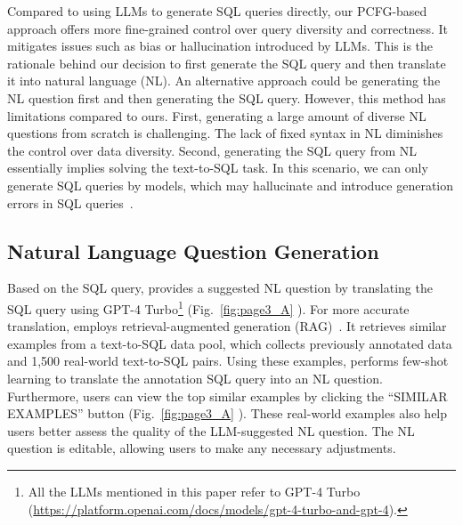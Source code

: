 Compared to using LLMs to generate SQL queries directly, our PCFG-based approach offers more fine-grained control over query diversity and correctness. It mitigates issues such as bias or hallucination introduced by LLMs. This is the rationale behind our decision to first generate the SQL query and then translate it into natural language (NL).
An alternative approach could be generating the NL question first and then generating the SQL query. However, this method has limitations compared to ours. 
First, generating a large amount of diverse NL questions from scratch is challenging. The lack of fixed syntax in NL diminishes the control over data diversity. 
Second, generating the SQL query from NL essentially implies solving the text-to-SQL task. In this scenario, we can only generate SQL queries by models, which may hallucinate and introduce generation errors in SQL queries~\cite{ning_empirical_2023, tiis_sql}.

\subsection{\textbf{Natural Language Question Generation}}
Based on the SQL query, {\tool} provides a suggested NL question by translating the SQL query using GPT-4 Turbo\footnote{All the LLMs mentioned in this paper refer to GPT-4 Turbo (\url{https://platform.openai.com/docs/models/gpt-4-turbo-and-gpt-4}).} (Fig.~\ref{fig:page3_A} ).
For more accurate translation, {\tool} employs retrieval-augmented generation  (RAG)~\cite{rag1, rag2}. 
It retrieves similar examples from a text-to-SQL data pool, which collects previously annotated data and 1,500 real-world text-to-SQL pairs. 
Using these examples, {\tool} performs few-shot learning to translate the annotation SQL query into an NL question.
Furthermore, users can view the top similar examples by clicking the ``SIMILAR EXAMPLES'' button (Fig.~\ref{fig:page3_A} ). These real-world examples also help users better assess the quality of the LLM-suggested NL question.
The NL question is editable, allowing users to make any necessary adjustments.



